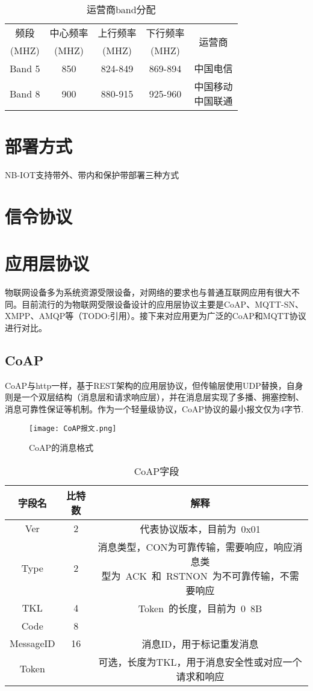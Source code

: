 \begin{table}[h!]
\caption{运营商band分配}
\begin{tabular}{ccccc}
\toprule
频段&中心频率&上行频率&下行频率&\multirow{2}{*}{运营商}\\
(MHZ)&(MHZ)&(MHZ)&(MHZ)&\\
\midrule
Band 5&850&824-849&869-894&中国电信\\
\midrule
Band 8&900&880-915&925-960&\makecell[c]{中国移动\\中国联通}\\
\bottomrule
\end{tabular}
\label{运营商band分配}
\end{table}


\section{部署方式}
NB-IOT支持带外、带内和保护带部署三种方式

\section{信令协议}

\section{应用层协议}

物联网设备多为系统资源受限设备，对网络的要求也与普通互联网应用有很大不同。目前流行的为物联网受限设备设计的应用层协议主要是CoAP、MQTT-SN、XMPP、AMQP等（TODO:引用）。接下来对应用更为广泛的CoAP和MQTT协议进行对比。

\subsection{CoAP}
CoAP与http一样，基于REST架构的应用层协议，但传输层使用UDP替换，自身则是一个双层结构（消息层和请求响应层），并在消息层实现了多播、拥塞控制、消息可靠性保证等机制。作为一个轻量级协议，CoAP协议的最小报文仅为4字节.

\begin{figure}[h]
	\texttt{[image: CoAP报文.png]}
	\caption{CoAP的消息格式}
	\label{CoAP报文}
\end{figure}

  
\begin{table}[h!]
\caption{CoAP字段}
\begin{tabular}{ccc}
\toprule
字段名 & 比特数 & 解释\\
\midrule
Ver&2&代表协议版本，目前为 0x01 \\
Type&2&\makecell[c]{消息类型，CON为可靠传输，需要响应，响应消息类\\型为 ACK 和 RSTNON 为不可靠传输，不需要响应}\\
TKL&4&Token 的长度，目前为 0~8B \\ 
Code&8&	\\
MessageID&16&消息ID，用于标记重发消息\\
Token&&可选，长度为TKL，用于消息安全性或对应一个请求和响应\\
\bottomrule
\end{tabular}
\label{coap字段}
\end{table}


